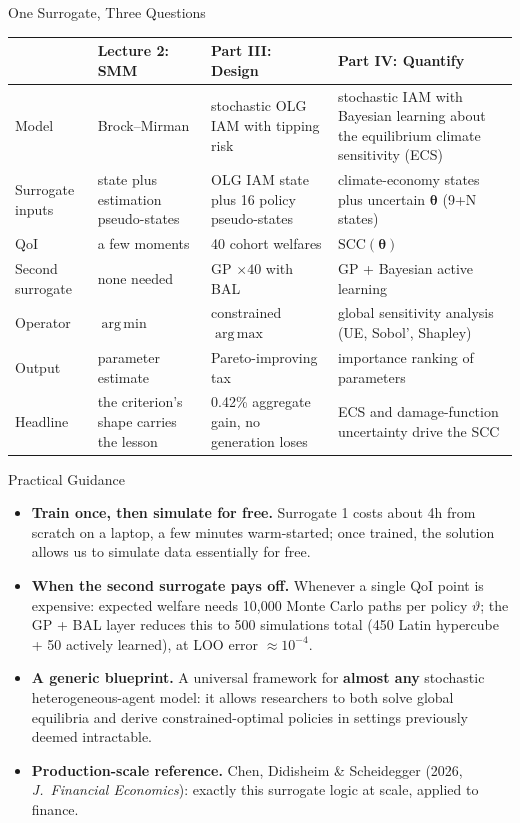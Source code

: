 \documentclass[aspectratio=169,11pt]{beamer}
\newcommand{\keyc}[1]{\textcolor{uzhblue}{#1}}
\DeclareMathOperator*{\argmin}{arg\,min}
\DeclareMathOperator*{\argmax}{arg\,max}
\begin{document}
\begin{frame}{One Surrogate, Three Questions}
\scriptsize
\begin{center}
\begin{tabular}{p{}p{}p{}p{}}
\toprule
 & \textbf{Lecture 2: SMM} & \textbf{Part III: Design} & \textbf{Part IV: Quantify} \\
\midrule
Model & Brock--Mirman & stochastic OLG IAM with tipping risk & stochastic IAM with Bayesian learning about the equilibrium climate sensitivity (ECS) \\
Surrogate inputs & state plus estimation pseudo-states & OLG IAM state plus 16 policy pseudo-states & climate-economy states plus uncertain $\bm{\theta}$ (9+N states) \\
QoI & a few moments & 40 cohort welfares & $\mathrm{SCC}(\bm{\theta})$ \\
Second surrogate & none needed & GP $\times 40$ with BAL & GP + Bayesian active learning \\
Operator & $\argmin$ & constrained $\argmax$ & global sensitivity analysis (UE, Sobol', Shapley) \\
Output & parameter estimate & Pareto-improving tax & importance ranking of parameters \\
Headline & the criterion's shape carries the lesson & 0.42\% aggregate gain, no generation loses & ECS and damage-function uncertainty drive the SCC \\
\bottomrule
\end{tabular}
\end{center}
\end{frame}

\begin{frame}{Practical Guidance}
\small
\begin{itemize}\itemsep6pt
\item \textbf{Train once, then simulate for free.} Surrogate 1 costs about 4h from scratch on a laptop, a few minutes warm-started; once trained, the solution allows us to simulate data essentially for free.
\item \textbf{When the second surrogate pays off.} Whenever a single QoI point is expensive: expected welfare needs 10{,}000 Monte Carlo paths per policy $\vartheta$; the GP + BAL layer reduces this to 500 simulations total (450 Latin hypercube + 50 actively learned), at LOO error $\approx 10^{-4}$.
\item \textbf{A generic blueprint.} A universal framework for \textbf{almost any} stochastic heterogeneous-agent model: it allows researchers to both \keyc{solve global equilibria} and derive \keyc{constrained-optimal policies} in settings previously deemed intractable.
\item \textbf{Production-scale reference.} Chen, Didisheim \& Scheidegger (2026, \emph{J.\ Financial Economics}): exactly this surrogate logic at scale, applied to finance.
\end{itemize}
\end{frame}
\end{document}
